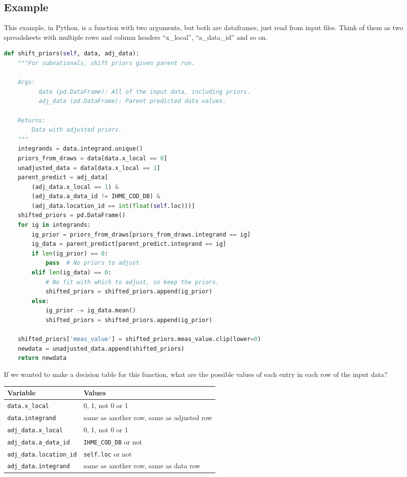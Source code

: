 \documentclass[fleqn,10pt]{olplainarticle}
\begin{document}
\subsection{Example}
This example, in Python, is a function with two arguments, but both
are dataframes, just read from input files. Think of them as two spreadsheets
with multiple rows and column headers ``x\_local'', ``a\_data\_id''
and so on.
\begin{lstlisting}[language=Python]
def shift_priors(self, data, adj_data):
    """For subnationals, shift priors given parent run.

    Args:
          data (pd.DataFrame): All of the input data, including priors.
          adj_data (pd.DataFrame): Parent predicted data values.

    Returns:
        Data with adjusted priors.
    """
    integrands = data.integrand.unique()
    priors_from_draws = data[data.x_local == 0]
    unadjusted_data = data[data.x_local == 1]
    parent_predict = adj_data[
        (adj_data.x_local == 1) &
        (adj_data.a_data_id != IHME_COD_DB) &
        (adj_data.location_id == int(float(self.loc)))]
    shifted_priors = pd.DataFrame()
    for ig in integrands:
        ig_prior = priors_from_draws[priors_from_draws.integrand == ig]
        ig_data = parent_predict[parent_predict.integrand == ig]
        if len(ig_prior) == 0:
            pass  # No priors to adjust
        elif len(ig_data) == 0:
            # No fit with which to adjust, so keep the priors.
            shifted_priors = shifted_priors.append(ig_prior)
        else:
            ig_prior -= ig_data.mean()
            shifted_priors = shifted_priors.append(ig_prior)

    shifted_priors['meas_value'] = shifted_priors.meas_value.clip(lower=0)
    newdata = unadjusted_data.append(shifted_priors)
    return newdata
\end{lstlisting}

If we wanted to make a decision table for this function, what are
the possible values of each entry in each row of the input data?

\begin{center}
\begin{tabular}{|l|l|}
\hline Variable & Values \\ \hline
\lstinline!data.x_local! & 0, 1, not 0 or 1 \\
\lstinline!data.integrand! & same as another row, same as adjusted row \\
\lstinline!adj_data.x_local! & 0, 1, not 0 or 1 \\
\lstinline!adj_data.a_data_id! & \lstinline!IHME_COD_DB! or not \\
\lstinline!adj_data.location_id! & \lstinline!self.loc! or not \\
\lstinline!adj_data.integrand! & same as another row, same as data row \\ \hline
\end{tabular}
\end{center}
\end{document}
